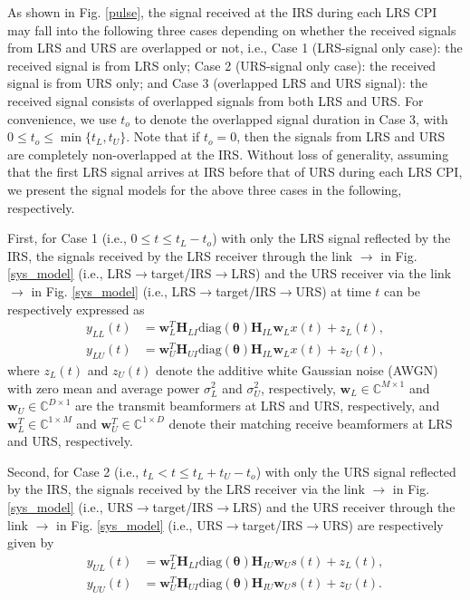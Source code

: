 \documentclass[10pt,final,doublecolumn]{IEEEtran}
\begin{document}
As shown in Fig. \ref{pulse}, the
signal received at the IRS during each LRS CPI may fall into the following three cases depending on whether the received signals from LRS and URS are overlapped or not, i.e.,
Case 1 (LRS-signal only case): the received signal is from LRS only; Case 2 (URS-signal only case): the received signal is from URS only; and Case 3 (overlapped LRS and URS signal): the received signal consists of overlapped signals from both LRS and URS. For convenience, we use $t_o$ to denote the overlapped signal duration in Case 3, with $0\leq t_o\leq \min\{t_L, t_U\}$. Note that if $t_o=0$, then the signals from LRS and URS are completely non-overlapped at the IRS.
Without loss of generality, assuming that the first LRS signal arrives at IRS before that of URS during each LRS CPI, we present the signal models for the above three cases in the following, respectively.

First, for Case 1 (i.e., $0\leq t \leq t_L-t_o $) with only the LRS signal reflected by the IRS, the signals received by the LRS receiver through the link $\rightarrow$ in Fig. \ref{sys_model} (i.e., LRS$\rightarrow $target/IRS$\rightarrow$LRS) and the URS receiver via the link $\rightarrow$ in Fig. \ref{sys_model} (i.e., LRS$\rightarrow$target/IRS$\rightarrow$URS) at time $t$ can be respectively expressed as
\begin{align}
y_{LL}(t)&=\mathbf{w}_{{L}}^T\mathbf{H}_{LI}
\text{diag}(\boldsymbol{\theta})\mathbf{H}_{IL}\mathbf{w}_{{L}}x(t)+z_{L}(t),\label{lrs1}\\
y_{LU}(t)&=\mathbf{w}_{{U}}^T\mathbf{H}_{UI}\text{diag}(\boldsymbol{\theta})\mathbf{H}_{IL}
\mathbf{w}_{{L}}x(t)+z_{U}(t),\label{lrs11}
\end{align}
where $z_{L}(t)$ and $z_{U}(t)$ denote the additive white Gaussian noise (AWGN) with zero mean and average power $\sigma_{L}^2$ and $\sigma_{U}^2$, respectively, $\mathbf{w}_{{L}}\in \mathbb{C}^{M \times 1}$ and $\mathbf{w}_{{U}} \in \mathbb{C}^{D \times 1}$ are the transmit beamformers at LRS and URS, respectively, and $\mathbf{w}_{{L}}^T\in \mathbb{C}^{1 \times M}$ and $\mathbf{w}_{{U}}^T\in \mathbb{C}^{1 \times D}$ denote their matching receive beamformers at LRS and URS, respectively.

Second, for Case 2 (i.e., $t_L < t \leq t_L+t_U-t_o$) with only the URS signal reflected by the IRS, the signals
received by the LRS receiver via the link $\rightarrow$ in Fig. \ref{sys_model} (i.e., URS$\rightarrow $target/IRS$\rightarrow$LRS) and the URS receiver through the link $\rightarrow$ in Fig. \ref{sys_model} (i.e., URS$\rightarrow $target/IRS$\rightarrow$URS)  are respectively given by
\begin{align}
y_{UL}(t)&=\mathbf{w}_{{L}}^T\mathbf{H}_{LI}\text{diag}(\boldsymbol{\theta})\mathbf{H}_{IU}
\mathbf{w}_{{U}}s(t)+z_{L}(t),\label{lrs22}\\
y_{UU}(t)&=\mathbf{w}_{{U}}^T\mathbf{H}_{UI}
\text{diag}(\boldsymbol{\theta})\mathbf{H}_{IU}\mathbf{w}_{{U}}s(t)+z_{U}(t).\label{lrs2}
\end{align}
\end{document}
